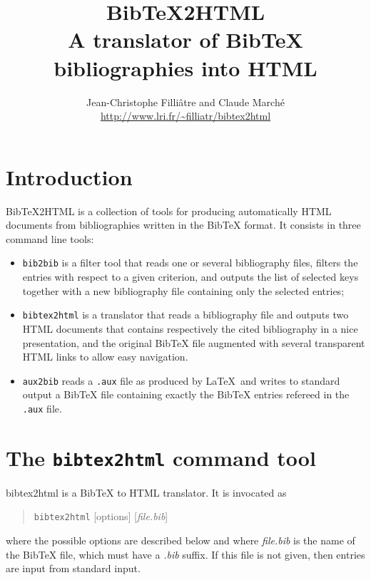 \documentclass[11pt,a4paper]{article}
\newcommand{\link}[2]{#2}
\newcommand{\monurl}[1]{\link{#1}{#1}}
\begin{document}
\title{BibTeX2HTML \\ A translator of BibTeX bibliographies into HTML}
\author{Jean-Christophe Filli\^{a}tre and Claude March\'e \\
        \normalsize\monurl{\url{http://www.lri.fr/~filliatr/bibtex2html}}}
\date{}
\maketitle

\tableofcontents


\section{Introduction}

BibTeX2HTML is a collection of tools for producing automatically HTML
documents from bibliographies written in the BibTeX format. It
consists in three command line tools:
\begin{itemize}
\item \texttt{bib2bib} is a filter tool that reads one or several
  bibliography files, filters the entries with respect to a given
  criterion, and outputs the list of selected keys together with a new
  bibliography file containing only the selected entries;
\item \texttt{bibtex2html} is a translator that reads a bibliography
  file and outputs two HTML documents that contains respectively the
  cited bibliography in a nice presentation, and the original BibTeX
  file augmented with several transparent HTML links to allow easy
  navigation. 
\item \texttt{aux2bib} reads a \texttt{.aux} file as produced by
  \LaTeX\ and writes to standard output a BibTeX file containing exactly the
  BibTeX entries refereed in the \texttt{.aux} file.
\end{itemize}


\section{The \texttt{bibtex2html} command tool}

bibtex2html is a BibTeX to HTML translator. It is invocated as 
\begin{quote}
\texttt{bibtex2html} [options] [\textit{file.bib}]
\end{quote}
where the possible \link{\#options}{options} are described below and
where \textit{file.bib} is the name of the BibTeX file, which must
have a \textit{.bib} suffix. If this file is not given, then entries
are input from standard input.
\end{document}
